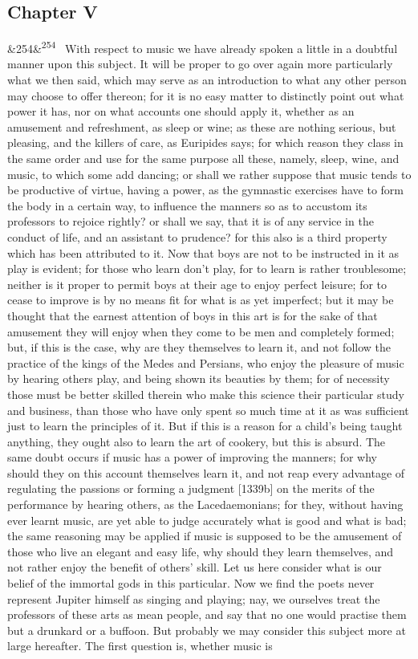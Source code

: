 \documentclass[12pt]{article}
\newcommand{\para}[1][]{\par\noindent\ifx&#1&\else\textsuperscript{\footnotesize #1}~\fi}
\begin{document}
\subsection*{Chapter V}

\para[254] With respect to music we have already spoken a little in a doubtful manner upon this subject. It will be proper to go over again more particularly what we then said, which may serve as an introduction to what any other person may choose to offer thereon; for it is no easy matter to distinctly point out what power it has, nor on what accounts one should apply it, whether as an amusement and refreshment, as sleep or wine; as these are nothing serious, but pleasing, and the killers of care, as Euripides says; for which reason they class in the same order and use for the same purpose all these, namely, sleep, wine, and music, to which some add dancing; or shall we rather suppose that music tends to be productive of virtue, having a power, as the gymnastic exercises have to form the body in a certain way, to influence the manners so as to accustom its professors to rejoice rightly? or shall we say, that it is of any service in the conduct of life, and an assistant to prudence? for this also is a third property which has been attributed to it. Now that boys are not to be instructed in it as play is evident; for those who learn don't play, for to learn is rather troublesome; neither is it proper to permit boys at their age to enjoy perfect leisure; for to cease to improve is by no means fit for what is as yet imperfect; but it may be thought that the earnest attention of boys in this art is for the sake of that amusement they will enjoy when they come to be men and completely formed; but, if this is the case, why are they themselves to learn it, and not follow the practice of the kings of the Medes and Persians, who enjoy the pleasure of music by hearing others play, and being shown its beauties by them; for of necessity those must be better skilled therein who make this science their particular study and business, than those who have only spent so much time at it as was sufficient just to learn the principles of it. But if this is a reason for a child's being taught anything, they ought also to learn the art of cookery, but this is absurd. The same doubt occurs if music has a power of improving the manners; for why should they on this account themselves learn it, and not reap every advantage of regulating the passions or forming a judgment [1339b] on the merits of the performance by hearing others, as the Lacedaemonians; for they, without having ever learnt music, are yet able to judge accurately what is good and what is bad; the same reasoning may be applied if music is supposed to be the amusement of those who live an elegant and easy life, why should they learn themselves, and not rather enjoy the benefit of others' skill. Let us here consider what is our belief of the immortal gods in this particular. Now we find the poets never represent Jupiter himself as singing and playing; nay, we ourselves treat the professors of these arts as mean people, and say that no one would practise them but a drunkard or a buffoon. But probably we may consider this subject more at large hereafter. The first question is, whether music is 
\end{document}
